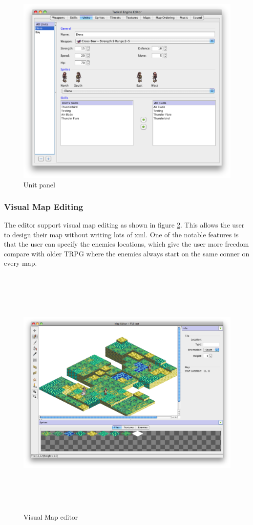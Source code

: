  \begin{figure}[htbp]
 	\centering
 		\includegraphics[scale=0.3]{figures/editor/Units.png}
 	\caption{Unit panel}
 	\label{fig:figures_editor_Units}
 \end{figure}
 
\clearpage
\subsubsection{Visual Map Editing}
The editor support visual map editing as shown in figure \ref{fig:figures_editor_Map}.  This allows the user to design their map without writing lots of xml. One of the notable features is that the user can specify the enemies locations, which give the user more freedom compare with older TRPG where the enemies always start on the same conner on every map.  

\begin{figure}[htbp]
	\centering
		\includegraphics[height=5in]{figures/editor/Map.png}
	\caption{Visual Map editor}
	\label{fig:figures_editor_Map}
\end{figure}


